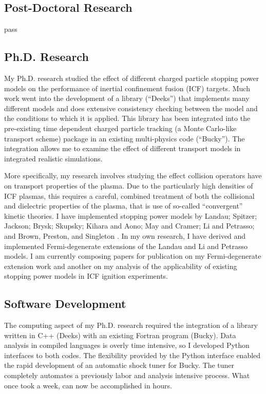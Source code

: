 \documentclass[letterpaper,11pt]{article}
\begin{document}
\subsection*{Post-Doctoral Research}
pass

\subsection*{Ph.D. Research}
My Ph.D. research studied the effect of different charged particle stopping
power models on the performance of inertial confinement fusion (ICF) targets.
Much work went into the development of a library (``Deeks'') that implements
many different models and does extensive consistency checking between the model
and the conditions to which it is applied.  This library has been integrated
into the pre-existing time dependent charged particle tracking (a Monte
Carlo-like transport scheme) package in an existing multi-physics code
(``Bucky'').  The integration allows me to examine the effect of different
transport models in integrated realistic simulations.

\vspace{0.1in}

More specifically, my research involves studying the effect collision operators have on transport properties of the plasma.  Due to the particularly high densities of ICF plasmas, this requires a careful, combined treatment of both the collisional and dielectric properties of the plasma, that is use of so-called ``convergent'' kinetic theories.  I have implemented stopping power models by 
Landau; 
Spitzer; 
Jackson; 
Brysk; 
Skupsky; 
Kihara and Aono; 
May and Cramer; 
Li and Petrasso; 
and 
Brown, Preston, and Singleton%
.
In my own research, I have derived and implemented Fermi-degenerate extensions of the Landau and Li and Petrasso models.  I am currently composing papers for publication on my Fermi-degenerate extension work and another on my analysis of the applicability of existing stopping power models in ICF ignition experiments.  


\subsection*{Software Development}
The computing aspect of my Ph.D. research required the integration of a library
written in C++ (Deeks) with an existing Fortran program (Bucky).  Data analysis
in compiled languages is overly time intensive, so I developed Python
interfaces to both codes.  The flexibility provided by the Python interface
enabled the rapid development of an automatic shock tuner for Bucky.  The tuner
completely automates a previously labor and analysis intensive process.  What
once took a week, can now be accomplished in hours.
\end{document}
